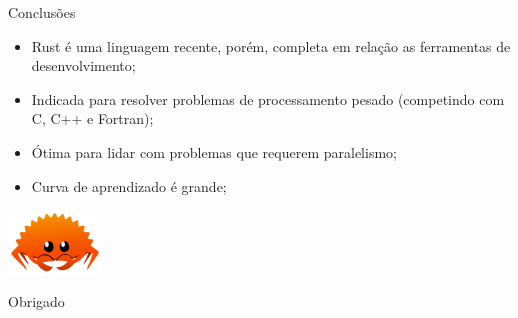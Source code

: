 \documentclass[aspectratio=169]{beamer}
\begin{document}
\begin{frame}{Conclusões}	
	\begin{itemize}
		\item Rust é uma linguagem recente, porém, completa em relação as ferramentas de desenvolvimento;
		\item Indicada para resolver problemas de processamento pesado (competindo com C, C++ e Fortran);
		\item Ótima para lidar com problemas que requerem paralelismo;
		\item Curva de aprendizado é grande;
	\end{itemize}	
\end{frame}

\begin{frame}[standout]
	\begin{center}
		\includegraphics[width=2.5cm]{imgs/rustacean.png}
	\end{center}
  	Obrigado		
\end{frame}
\end{document}
